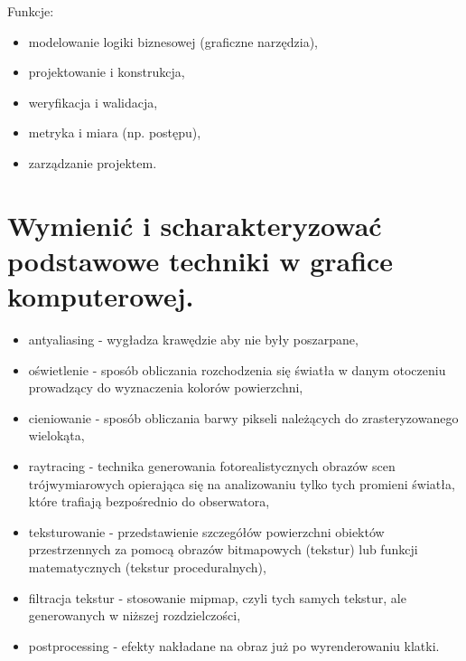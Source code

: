 \documentclass[12pt,a4paper]{article}
\begin{document}
	Funkcje:
	\begin{itemize}
		\item modelowanie logiki biznesowej (graficzne narzędzia),
		\item projektowanie i konstrukcja,
		\item weryfikacja i walidacja,
		\item metryka i miara (np. postępu),
		\item zarządzanie projektem.
	\end{itemize}


	\section{Wymienić i scharakteryzować podstawowe techniki w grafice komputerowej.}
	\begin{itemize}
		\item antyaliasing - wygładza krawędzie aby nie były poszarpane,
		\item oświetlenie - sposób obliczania rozchodzenia się światła w danym otoczeniu prowadzący do wyznaczenia kolorów powierzchni, 
		\item cieniowanie - sposób obliczania barwy pikseli należących do zrasteryzowanego wielokąta,
		\item raytracing - technika generowania fotorealistycznych obrazów scen trójwymiarowych opierająca się na analizowaniu tylko tych promieni światła, które trafiają bezpośrednio do obserwatora, 
		\item teksturowanie - przedstawienie szczegółów powierzchni obiektów przestrzennych za pomocą obrazów bitmapowych (tekstur) lub funkcji matematycznych (tekstur proceduralnych),
		\item filtracja tekstur - stosowanie mipmap, czyli tych samych tekstur, ale generowanych w niższej rozdzielczości,
		\item postprocessing - efekty nakładane na obraz już po wyrenderowaniu klatki.
	\end{itemize}
\end{document}
